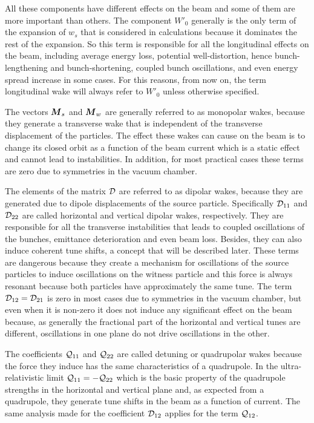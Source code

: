     All these components have different effects on the beam and some of them are more important than others. The component $W'_0$ generally is the only term of the expansion of $w_s$ that is considered in calculations because it dominates the rest of the expansion. So this term is responsible for all the longitudinal effects on the beam, including average energy loss, potential well-distortion, hence bunch-lengthening and bunch-shortening, coupled bunch oscillations, and even energy spread increase in some cases. For this reasons, from now on, the term longitudinal wake will always refer to $W'_0$ unless otherwise specified.

    The vectors $\boldsymbol{M}_s$ and $\boldsymbol{M}_w$ are generally referred to as monopolar wakes, because they generate a transverse wake that is independent of the transverse displacement of the particles. The effect these wakes can cause on the beam is to change its closed orbit as a function of the beam current which is a static effect and cannot lead to instabilities. In addition, for most practical cases these terms are zero due to symmetries in the vacuum chamber.

    The elements of the matrix $\mathcal{D}$ are referred to as dipolar wakes, because they are generated due to dipole displacements of the source particle. Specifically $\mathcal{D}_{11}$ and $\mathcal{D}_{22}$ are called horizontal and vertical dipolar wakes, respectively. They are responsible for all the transverse instabilities that leads to coupled oscillations of the bunches, emittance deterioration and even beam loss. Besides, they can also induce coherent tune shifts, a concept that will be described later. These terms are dangerous because they create a mechanism for oscillations of the source particles to induce oscillations on the witness particle and this force is always resonant because both particles have approximately the same tune. The term $\mathcal{D}_{12}=\mathcal{D}_{21}$ is zero in most cases due to symmetries in the vacuum chamber, but even when it is non-zero it does not induce any significant effect on the beam because, as generally the fractional part of the horizontal and vertical tunes are different, oscillations in one plane do not drive oscillations in the other.

    The coefficients $\mathcal{Q}_{11}$ and $\mathcal{Q}_{22}$ are called detuning or quadrupolar wakes because the force they induce has the same characteristics of a quadrupole. In the ultra-relativistic limit $\mathcal{Q}_{11}=-\mathcal{Q}_{22}$ which is the basic property of the quadrupole strengths in the horizontal and vertical plane and, as expected from a quadrupole, they generate tune shifts in the beam as a function of current. The same analysis made for the coefficient $\mathcal{D}_{12}$ applies for the term $\mathcal{Q}_{12}$.

